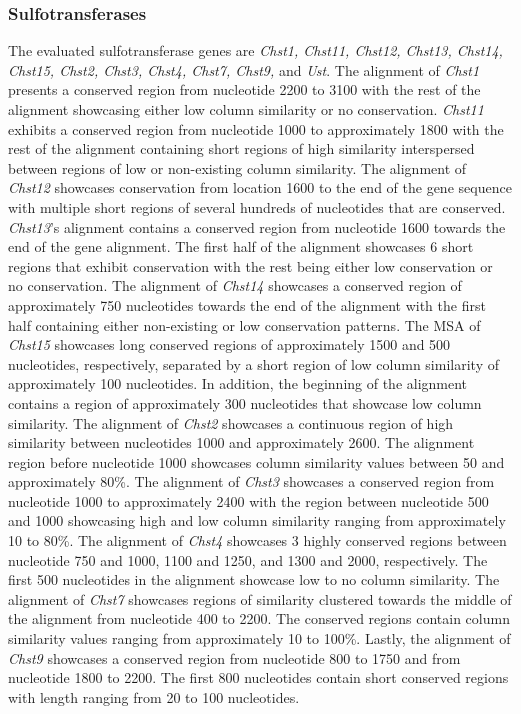 \documentclass{article}
\begin{document}
\subsubsection*{Sulfotransferases}
The evaluated sulfotransferase genes are \textit{Chst1, Chst11, Chst12, Chst13, Chst14, Chst15, Chst2, Chst3, Chst4, Chst7, Chst9,} and \textit{Ust}. The alignment of \textit{Chst1} presents a conserved region from nucleotide 2200 to 3100 with the rest of the alignment showcasing either low column similarity or no conservation. \textit{Chst11} exhibits a conserved region from nucleotide 1000 to approximately 1800 with the rest of the alignment containing short regions of high similarity interspersed between regions of low or non-existing column similarity. The alignment of \textit{Chst12} showcases conservation from location 1600 to the end of the gene sequence with multiple short regions of several hundreds of nucleotides that are conserved. \textit{Chst13}'s alignment contains a conserved region from nucleotide 1600 towards the end of the gene alignment. The first half of the alignment showcases 6 short regions that exhibit conservation with the rest being either low conservation or no conservation. The alignment of \textit{Chst14} showcases a conserved region of approximately 750 nucleotides towards the end of the alignment with the first half containing either non-existing or low conservation patterns. The MSA of \textit{Chst15} showcases long conserved regions of approximately 1500 and 500 nucleotides, respectively, separated by a short region of low column similarity of approximately 100 nucleotides. In addition, the beginning of the alignment contains a region of approximately 300 nucleotides that showcase low column similarity. The alignment of \textit{Chst2} showcases a continuous region of high similarity between nucleotides 1000 and approximately 2600. The alignment region before nucleotide 1000 showcases column similarity values between 50 and approximately 80\%. The alignment of \textit{Chst3} showcases a conserved region from nucleotide 1000 to approximately 2400 with the region between nucleotide 500 and 1000 showcasing high and low column similarity ranging from approximately 10 to 80\%. The alignment of \textit{Chst4} showcases 3 highly conserved regions between nucleotide 750 and 1000, 1100 and 1250, and 1300 and 2000, respectively. The first 500 nucleotides in the alignment showcase low to no column similarity. The alignment of \textit{Chst7} showcases regions of similarity clustered towards the middle of the alignment from nucleotide 400 to 2200. The conserved regions contain column similarity values ranging from approximately 10 to 100\%. Lastly, the alignment of \textit{Chst9} showcases a conserved region from nucleotide 800 to 1750 and from nucleotide 1800 to 2200. The first 800 nucleotides contain short conserved regions with length ranging from 20 to 100 nucleotides. 
\end{document}
